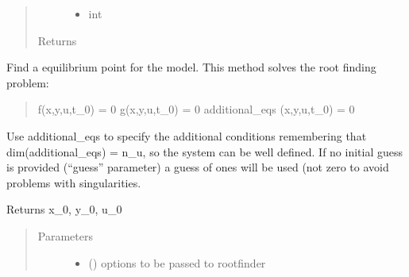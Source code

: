 \documentclass[letterpaper,10pt,english]{sphinxmanual}
\begin{document}
\begin{fulllineitems}
\begin{fulllineitems}
\begin{quote}
\begin{description}
\begin{itemize}
\item {} 
 \textendash{} int

\end{itemize}

\item[{Returns}] \leavevmode


\end{description}\end{quote}

\end{fulllineitems}


\begin{fulllineitems}
\label{\detokenize{yaocptool.modelling:yaocptool.modelling.system_model.SystemModel.find_algebraic_variable}}
\end{fulllineitems}


\begin{fulllineitems}
\label{\detokenize{yaocptool.modelling:yaocptool.modelling.system_model.SystemModel.find_equilibrium}}
Find a equilibrium point for the model.
This method solves the root finding problem:
\begin{quote}

f(x,y,u,t\_0) = 0
g(x,y,u,t\_0) = 0
additional\_eqs (x,y,u,t\_0) = 0
\end{quote}

Use additional\_eqs to specify the additional conditions remembering that dim(additional\_eqs) = n\_u,
so the system can be well defined.
If no initial guess is provided (“guess” parameter) a guess of ones will be used (not zero to avoid problems
with singularities.

Returns x\_0, y\_0, u\_0
\begin{quote}\begin{description}
\item[{Parameters}] \leavevmode\begin{itemize}
\item {} 
 () \textendash{} options to be passed to rootfinder


\end{itemize}
\end{description}
\end{quote}
\end{fulllineitems}
\end{fulllineitems}
\end{document}
